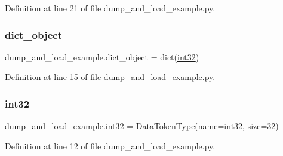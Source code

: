 Definition at line 21 of file dump\+\_\+and\+\_\+load\+\_\+example.\+py.

\mbox{\label{namespacedump__and__load__example_a0e5d16dccda2cfc0eaf7eefb4d1db609}} 
\subsubsection{\texorpdfstring{dict\+\_\+object}{dict\_object}}
{\footnotesize\ttfamily dump\+\_\+and\+\_\+load\+\_\+example.\+dict\+\_\+object = dict(\hyperlink{namespacedump__and__load__example_ab4af7f95fadf43e2c2e1226297d1da8b}{int32})}



Definition at line 15 of file dump\+\_\+and\+\_\+load\+\_\+example.\+py.

\mbox{\label{namespacedump__and__load__example_ab4af7f95fadf43e2c2e1226297d1da8b}} 
\subsubsection{\texorpdfstring{int32}{int32}}
{\footnotesize\ttfamily dump\+\_\+and\+\_\+load\+\_\+example.\+int32 = \hyperlink{classsylva_1_1base_1_1sdf_1_1_data_token_type}{Data\+Token\+Type}(name=\textquotesingle{}int32\textquotesingle{}, size=32)}



Definition at line 12 of file dump\+\_\+and\+\_\+load\+\_\+example.\+py.

